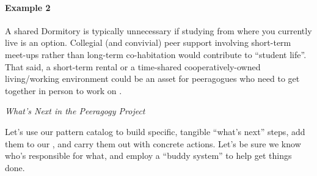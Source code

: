 \begin{refsection}
\paragraph{Example 2}
A shared Dormitory is typically unnecessary if studying from where you
currently live is an option.  Collegial (and convivial) peer support
involving short-term meet-ups rather than long-term co-habitation
would contribute to ``student life''.  That said, a short-term rental
or a time-shared cooperatively-owned living\slash working environment
could be an asset for peeragogues who need to get together in person
to work on .


\begin{framed}
\noindent 
\emph{What's Next in the Peeragogy Project}
\begin{collectinmacro}{\SpecificWN}{}{}
Let's use our pattern catalog to build specific, tangible ``what's
next'' steps, add them to our , and carry them
out with concrete actions.  Let's be sure we know who's responsible
for what, and employ a ``buddy system'' to help get things done.
\end{collectinmacro}
\SpecificWN
\end{framed}


\printbibliography[heading=subbibliography]
\end{refsection}
